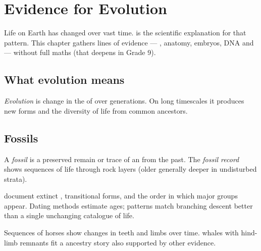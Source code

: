 \chapter{Evidence for Evolution}\label{ch:g8:evolution}

Life on Earth has changed over vast time.  is the scientific
explanation for that pattern. This chapter gathers lines of evidence ---
, anatomy, embryos, DNA and  --- without full  maths (that deepens in Grade 9).

\section{What evolution means}

\begin{definition}[Evolution]\label{def:g8:evolution:def}
\emph{Evolution} is change in the  of
 over generations. On long timescales it produces new forms
and the diversity of life from common ancestors.
\end{definition}

\section{Fossils}

\begin{definition}[Fossil]\label{def:g8:evolution:fossil}
A \emph{fossil} is a preserved remain or trace of an
 from the past. The \emph{fossil record}
shows sequences of life through rock layers (older generally deeper in
undisturbed strata).
\end{definition}

\begin{proposition}\label{prop:g8:evolution:fossils}
 document extinct , transitional forms, and the order in
which major groups appear. Dating methods estimate ages; patterns match
branching descent better than a single unchanging catalogue of life.
\end{proposition}
\admitted

\begin{example}\label{ex:g8:evolution:trans}
Sequences of  horses show changes in teeth and limbs over time.
 whales with hind-limb remnants fit a  ancestry story
also supported by other evidence.
\end{example}

